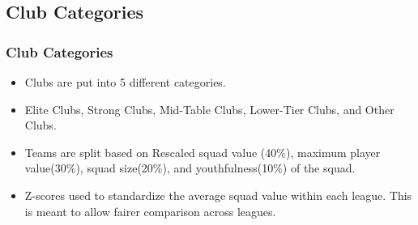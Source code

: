\documentclass[t,aspectratio=169,xcolor=dvipsnames]{beamer}
\begin{document}
\subsection{Club Categories}
\begin{frame}

    \frametitle{Club Categories} 

     \begin{itemize}   
        \item Clubs are put into 5 different categories. 
        \item Elite Clubs, Strong Clubs, Mid-Table Clubs, Lower-Tier Clubs, and Other Clubs. 
        \item Teams are split based on Rescaled squad value (40\%), maximum player value(30\%), squad size(20\%), and youthfulness(10\%) of the squad. 
        \item Z-scores used to standardize the average squad value within each league. This is meant to allow fairer comparison across leagues. 
    \end{itemize}
        
    \resizebox{\textwidth}{!}{
    
}
\end{frame}
\end{document}
